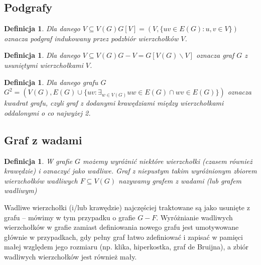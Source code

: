 \documentclass{pracamgr}
\newtheorem{defi}[theorem]{Definicja} %
\begin{document}
   \subsection{Podgrafy}
    \begin{defi}\label{podgraf indukowany}
     Dla danego $V\subseteq V(G)$\quad $G[V]=(V,\{uv\in E(G):u,v\in V\})$ oznacza \emph{podgraf indukowany} przez podzbiór wierzchołków $V$.
    \end{defi}
    \begin{defi}\label{roznica grafow}
     Dla danego $V\subseteq V(G)$\quad $G-V=G[V(G)\backslash V]$ oznacza \emph{graf $G$ z usuniętymi wierzchołkami $V$}.
    \end{defi}
    \begin{defi}\label{kwadrat grafu}
     Dla danego grafu $G$\newline $G^2=(V(G),E(G)\cup\{uv:\exists_{w\in V(G)}uw\in E(G)\cap wv\in E(G)\})$
     oznacza \emph{kwadrat grafu}, czyli graf z dodanymi krawędziami między wierzchołkami oddalonymi o co najwyżej 2.
    \end{defi}
   \subsection{Graf z wadami}
    \begin{defi}\label{graf z wadami}
     W grafie $G$ możemy wyróżnić niektóre wierzchołki (czasem również krawędzie) i oznaczyć jako wadliwe.
     Graf z niepustym takim wyróżnionym zbiorem wierzchołków wadliwych $F\subseteq V(G)$ nazywamy \emph{grafem z wadami} (lub \emph{grafem wadliwym})
    \end{defi}
    Wadliwe wierzchołki (i/lub krawędzie) najczęściej traktowane są jako usunięte z grafu -- mówimy w tym przypadku o grafie $G-F$.
    Wyróżnianie wadliwych wierzchołków w grafie zamiast definiowania nowego grafu jest umotywowane głównie w przypadkach,
    gdy pełny graf łatwo zdefiniować i zapisać w pamięci małej względem jego rozmiaru (np. klika, hiperkostka, graf de Bruijna),
    a zbiór wadliwych wierzchołków jest również mały.%
\end{document}
